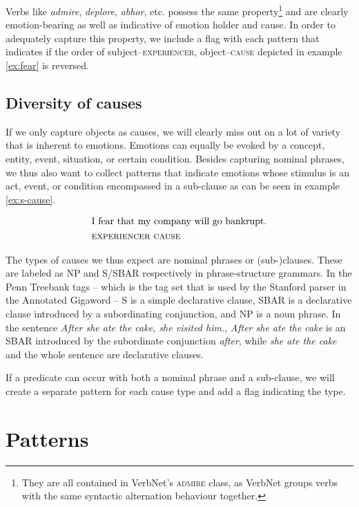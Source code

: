 Verbs like \textit{admire}, \textit{deplore}, \textit{abhor}, etc. possess the same property\footnote{They are all contained in VerbNet's \textsc{admire} class, as VerbNet groups verbs with the same syntactic alternation behaviour together.} and are clearly emotion-bearing as well as indicative of emotion holder and cause. In order to adequately capture this property, we include a flag with each pattern that indicates if the order of subject--\textsc{experiencer}, object--\textsc{cause} depicted in example \ref{ex:fear} is reversed.

\subsection{Diversity of causes}

If we only capture objects as causes, we will clearly miss out on a lot of variety that is inherent to emotions. Emotions can equally be evoked by a concept, entity, event, situation, or certain condition. Besides capturing nominal phrases, we thus also want to collect patterns that indicate emotions whose stimulus is an act, event, or condition encompassed in a sub-clause as can be seen in example \ref{ex:s-cause}.

\begin{align}
\begin{split}\label{ex:s-cause}
&\textnormal{I fear that my company will go bankrupt.}\\
&\textnormal{\textsc{experiencer}	\textsc{cause}}
\end{split}
\end{align}

The types of causes we thus expect are nominal phrases or (sub-)clauses. These are labeled as NP and S/SBAR respectively in phrase-structure grammars. In the Penn Treebank tags -- which is the tag set that is used by the Stanford parser in the Annotated Gigaword -- S is a simple declarative clause, SBAR is a declarative clause introduced by a subordinating conjunction, and NP is a noun phrase. In the sentence \textit{After she ate the cake, she visited him.}, \textit{After she ate the cake} is an SBAR introduced by the subordinate conjunction \textit{after}, while \textit{she ate the cake} and the whole sentence are declarative clauses.

If a predicate can occur with both a nominal phrase and a sub-clause, we will create a separate pattern for each cause type and add a flag indicating the type.

\section{Patterns} \label{sec:patterns}

